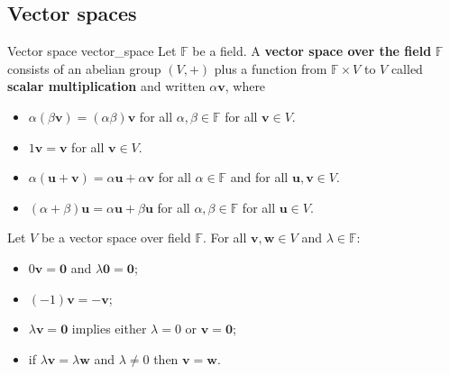 \subsection{Vector spaces}

\begin{definition}{Vector space \cite{math2601_notes}}{vector_space}
Let $\mathbb{F}$ be a field. A \textbf{vector space over the field} $\mathbb{F}$ consists of an abelian group $(V, +)$ plus a function from $\mathbb{F} \times V$ to $V$ called \textbf{scalar multiplication} and written $\alpha \mathbf{v}$, where
\begin{itemize}
	\item $\alpha (\beta \mathbf{v}) = (\alpha \beta) \mathbf{v}$ for all $\alpha, \beta \in \mathbb{F}$ for all $\mathbf{v} \in V$.
	\item $1 \mathbf{v} = \mathbf{v}$ for all $\mathbf{v} \in V$.
	\item $\alpha (\mathbf{u} + \mathbf{v}) = \alpha \mathbf{u} + \alpha \mathbf{v}$ for all $\alpha \in \mathbb{F}$ and for all $\mathbf{u}, \mathbf{v} \in V$.
	\item $(\alpha + \beta) \mathbf{u} = \alpha \mathbf{u} + \beta \mathbf{u}$ for all $\alpha, \beta \in \mathbb{F}$ for all $\mathbf{u} \in V$.
\end{itemize}
\end{definition}

\begin{lemma}{\cite{math2601_notes}}{}
Let $V$ be a vector space over field $\mathbb{F}$. For all $\mathbf{v}, \mathbf{w} \in V$ and $\lambda \in \mathbb{F}$:
\begin{itemize}
	\item $0 \mathbf{v} = \mathbf{0}$ and $\lambda \mathbf{0} = \mathbf{0}$;
	\item $(-1) \mathbf{v} = - \mathbf{v}$;\
	\item $\lambda \mathbf{v} = \mathbf{0}$ implies either $\lambda = 0$ or $\mathbf{v} = \mathbf{0}$;
	\item if $\lambda \mathbf{v} = \lambda \mathbf{w}$ and $\lambda \not = 0$ then $\mathbf{v} = \mathbf{w}$.
\end{itemize}
\end{lemma}